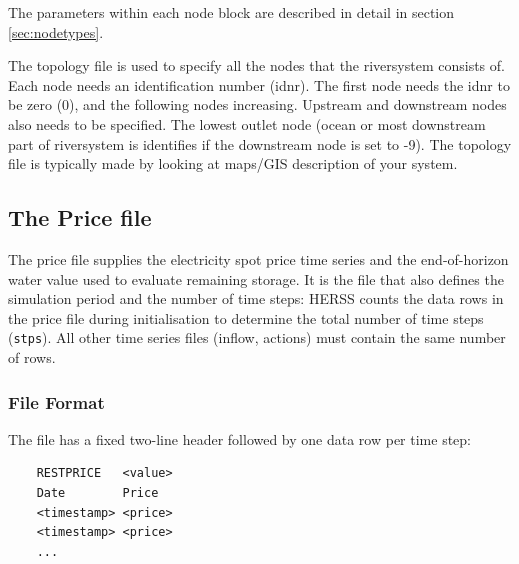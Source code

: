 \documentclass[a4paper, 12pt]{report}
\begin{document}
	The parameters within each node block are described in detail in section \ref{sec:nodetypes}.

	The topology file is used to specify all the nodes that the riversystem consists of. Each node needs an identification number (idnr). The first node needs the idnr to be zero (0), and the following nodes increasing. Upstream and downstream nodes also needs to be specified. The lowest outlet node (ocean or most downstream part of riversystem is identifies if the downstream node is set to -9). The topology file is typically 
	made by looking at maps/GIS description of your system. 



	\subsection{The Price file}
	\label{sec:pricefile}

	The price file supplies the electricity spot price time series and the end-of-horizon
	water value used to evaluate remaining storage. It is the file that also defines the
	simulation period and the number of time steps: HERSS counts the data rows in the price
	file during initialisation to determine the total number of time steps (\texttt{stps}).
	All other time series files (inflow, actions) must contain the same number of rows.

	\subsubsection{File Format}

	The file has a fixed two-line header followed by one data row per time step:

	\begin{verbatim}
	RESTPRICE   <value>
	Date        Price
	<timestamp> <price>
	<timestamp> <price>
	...
	\end{verbatim}
\end{document}
